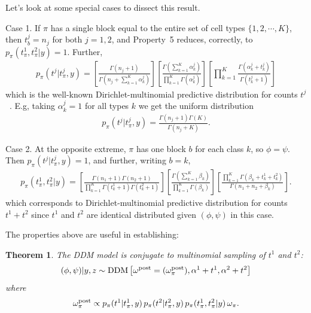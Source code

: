 \documentclass[aoas,preprint]{imsart}
\newtheorem{theorem}{Theorem}
\begin{document}
Let's look at some special cases to dissect this result. 

Case 1. If $\pi$ has a single block equal to the entire
 set of cell types $\{1,2, \cdots, K\}$,  then $t^j_b=n_j$ for both $j=1,2$,
and Property~5 reduces, correctly, to 
$p_\pi(t^1_{\pi},t^2_{\pi}| y) = 1$.  Further,
\begin{eqnarray*}
p_\pi(t^j | t^j_{\pi},y) = 
\left[ \frac{ \Gamma(n_j +1 ) }{ \Gamma( n_j + \sum_{k=1}^K \alpha_k^j ) }
\right]
\left[ \frac{\Gamma( \sum_{k =1}^K \alpha_k^j )}{
                \prod_{k=1}^K \Gamma( \alpha_k^j ) } \right]
       \left[    \prod_{k=1}^K    \frac{  \Gamma(\alpha_k^j + t^j_k)}{
                \Gamma(t^j_k + 1 )}\right]
\end{eqnarray*}
which is the well-known Dirichlet-multinomial predictive distribution
for counts $t^j$~\citep{Wag}.  E.g, taking $\alpha_k^j=1$ for all types $k$ 
we get the uniform distribution
\begin{eqnarray*}
p_\pi(t^j | t^j_{\pi},y) = 
 \frac{ \Gamma(n_j +1 ) \Gamma(K) }{ \Gamma( n_j + K ) }.
\end{eqnarray*}

Case 2. At the opposite extreme, $\pi$  has one block $b$ for each
 class $k$, so $\phi=\psi$. Then $p_\pi(t^j | t^j_{\pi},y) = 1$, and 
further, writing $b = k$,
\begin{eqnarray*}
p_\pi(t^1_{\pi},t^2_{\pi}|y ) =
 \left[ \frac{ \Gamma(n_1+1) \Gamma(n_2+1) }{ \prod_{k=1}^K 
   \Gamma(t^1_k+1) 
   \Gamma( t^2_k + 1 )} \right] 
\left[ \frac{\Gamma( \sum_{k=1}^K \beta_k  )}{
   \prod_{k=1}^K \Gamma(\beta_k)} \right] 
 \left[ \frac{ \prod_{k=1}^K \Gamma( \beta_k + t^1_k + t^2_k )}{
	\Gamma( n_1 + n_2 + \beta_k  )} \right].
\end{eqnarray*}
which corresponds to Dirichlet-multinomial predictive distribution for counts $t^1 + t^2$ 
since $t^1$ and $t^2$ are identical distributed given $(\phi,\psi)$ in this case.


The properties above are useful in establishing:
\begin{theorem}
The DDM model is conjugate to multinomial sampling of $t^1$ and $t^2$:
\begin{eqnarray*}
(\phi,\psi)|y,z  \sim {\mbox {\rm DDM}}\left[ \omega^{\rm post}=(\omega^{\rm post}_\pi), \alpha^1 + t^1, \alpha^2 + t^2  \right]
\end{eqnarray*}
where
\begin{eqnarray*}
\omega^{\rm post}_\pi \propto 
 p_\pi(t^1 | t^1_{\pi},y)\, p_\pi(t^2|  t^2_{\pi},y )
 \, p_\pi( t^1_{\pi}, t^2_{\pi} | y ) \, \omega_\pi.
\end{eqnarray*}

\end{theorem}
\end{document}
